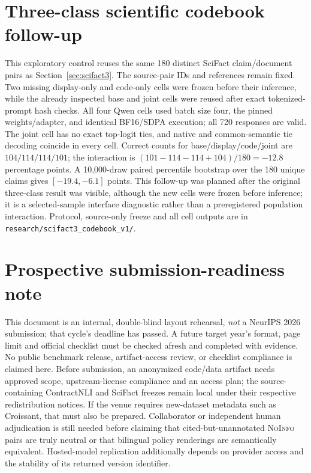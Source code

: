 \section{Three-class scientific codebook follow-up}
\label{app:scifact3-codebook-brief}
This exploratory control reuses the same 180 distinct SciFact claim/document pairs as Section~\ref{sec:scifact3}. The source-pair IDs and references remain fixed. Two missing display-only and code-only cells were frozen before their inference, while the already inspected base and joint cells were reused after exact tokenized-prompt hash checks. All four Qwen cells used batch size four, the pinned weights/adapter, and identical BF16/SDPA execution; all 720 responses are valid. The joint cell has no exact top-logit ties, and native and common-semantic tie decoding coincide in every cell. Correct counts for base/display/code/joint are $104/114/114/101$; the interaction is $(101-114-114+104)/180=-12.8$ percentage points. A 10,000-draw paired percentile bootstrap over the 180 unique claims gives $[-19.4,-6.1]$ points. This follow-up was planned after the original three-class result was visible, although the new cells were frozen before inference; it is a selected-sample interface diagnostic rather than a preregistered population interaction. Protocol, source-only freeze and all cell outputs are in \texttt{research/scifact3\_codebook\_v1/}.









\section{Prospective submission-readiness note}
\label{app:readiness}
This document is an internal, double-blind layout rehearsal, \emph{not} a NeurIPS 2026 submission; that cycle's deadline has passed. A future target year's format, page limit and official checklist must be checked afresh and completed with evidence. No public benchmark release, artifact-access review, or checklist compliance is claimed here. Before submission, an anonymized code/data artifact needs approved scope, upstream-license compliance and an access plan; the source-containing ContractNLI and SciFact freezes remain local under their respective redistribution notices. If the venue requires new-dataset metadata such as Croissant, that must also be prepared. Collaborator or independent human adjudication is still needed before claiming that cited-but-unannotated \textsc{NoInfo} pairs are truly neutral or that bilingual policy renderings are semantically equivalent. Hosted-model replication additionally depends on provider access and the stability of its returned version identifier.

